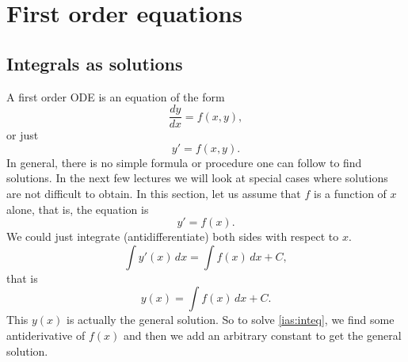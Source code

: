 \chapter{First order equations} \label{fo:chapter}


\section{Integrals as solutions}
\label{integralsols:section}



A first order ODE is an equation of the form
\begin{equation*}
\frac{dy}{dx} = f(x,y) ,
\end{equation*}
or just
\begin{equation*}
y' = f(x,y) .
\end{equation*}
In general, there is no simple formula or procedure one can follow to find
solutions.
In the next few lectures we will look at special cases where solutions are not
difficult to obtain.
In this section, let us assume that $f$ is a function of $x$ alone,
that is, the equation is
\begin{equation} \label{ias:inteq}
y' = f(x) .
\end{equation}
We could just integrate (antidifferentiate) both sides with respect to $x$.
\begin{equation*}
\int y'(x) \,dx = \int f(x) \,dx + C ,
\end{equation*}
that is
\begin{equation*}
y(x) = \int f(x) \,dx + C .
\end{equation*}
This $y(x)$ is actually the general solution.
So to solve \eqref{ias:inteq},
we find some antiderivative of $f(x)$
and then we add an arbitrary constant to get the general solution.

\medskip

